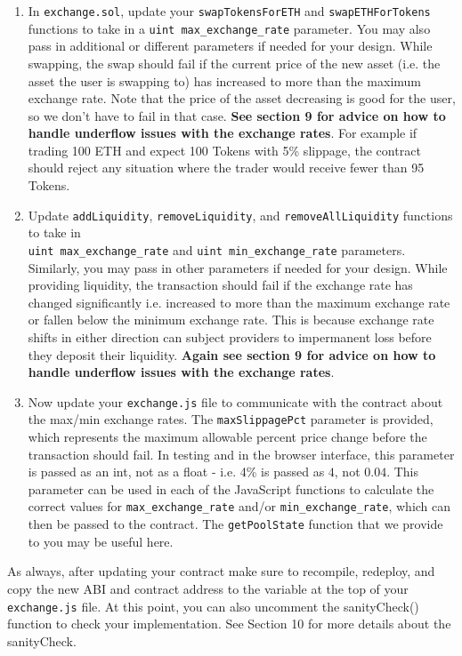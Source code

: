 \documentclass[11pt]{article}
\begin{document}
\begin{enumerate}
    \item In \texttt{exchange.sol}, update your \texttt{swapTokensForETH} and \texttt{swapETHForTokens} functions to take in a \texttt{uint max\_exchange\_rate} parameter. You may also pass in additional or different parameters if needed for your design. While swapping, the swap should fail if the current price of the new asset (i.e. the asset the user is swapping to) has increased to more than the maximum exchange rate. Note that the price of the asset decreasing is good for the user, so we don't have to fail in that case. \textbf{See section 9 for advice on how to handle underflow issues with the exchange rates}. For example if trading 100 ETH and expect 100 Tokens with 5\% slippage, the contract should reject any situation where the trader would receive fewer than 95 Tokens.
    \item Update \texttt{addLiquidity}, \texttt{removeLiquidity}, and \texttt{removeAllLiquidity} functions to take in \\
    \texttt{uint max\_exchange\_rate} and \texttt{uint min\_exchange\_rate} parameters. Similarly, you may pass in other parameters if needed for your design. While providing liquidity, the transaction should fail if the exchange rate has changed significantly i.e. increased to more than the maximum exchange rate or fallen below the minimum exchange rate. This is because exchange rate shifts in either direction can subject providers to impermanent loss before they deposit their liquidity. \textbf{Again see section 9 for advice on how to handle underflow issues with the exchange rates}.
    \item Now update your \texttt{exchange.js} file to communicate with the contract about the max/min exchange rates. The \texttt{maxSlippagePct} parameter is provided, which represents the maximum allowable percent price change before the transaction should fail. In testing and in the browser interface, this parameter is passed as an int, not as a float - i.e. 4\% is passed as $4$, not $0.04$. This parameter can be used in each of the JavaScript functions to calculate the correct values for \texttt{max\_exchange\_rate} and/or \texttt{min\_exchange\_rate}, which can then be passed to the contract. The \texttt{getPoolState} function that we provide to you may be useful here.
\end{enumerate}

As always, after updating your contract make sure to recompile, redeploy, and copy the new ABI and contract address to the variable at the top of your \texttt{exchange.js} file. At this point, you can also uncomment the sanityCheck() function to check your implementation. See Section 10 for more details about the sanityCheck. 
\end{document}
